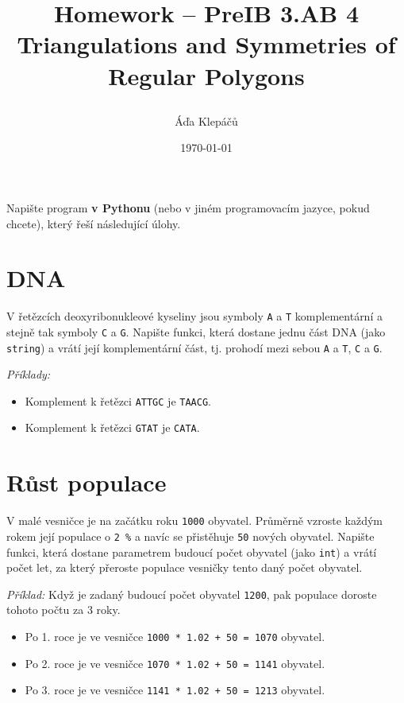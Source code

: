 \documentclass[a4paper,11pt]{article}
\title{\Huge\textsf{Homework -- PreIB 3.AB 4}\\
 \Large\textsf{Triangulations and Symmetries of Regular Polygons}
 \author{Áďa Klepáčů}
 \date{\today}
}
\begin{document}
\thispagestyle{fancy}

Napište program \textbf{v Pythonu} (nebo v jiném programovacím jazyce, pokud
chcete), který řeší následující úlohy.

\section*{DNA}

V řetězcích deoxyribonukleové kyseliny jsou symboly \texttt{A} a \texttt{T}
komplementární a stejně tak symboly \texttt{C} a \texttt{G}. Napište funkci,
která dostane jednu část DNA (jako \texttt{string}) a vrátí její komplementární
část, tj. prohodí mezi sebou \texttt{A} a \texttt{T}, \texttt{C} a \texttt{G}.

\emph{Příklady:}
\begin{itemize}
 \item Komplement k řetězci \texttt{ATTGC} je \texttt{TAACG}.
 \item Komplement k řetězci \texttt{GTAT} je \texttt{CATA}.
\end{itemize}

\section*{Růst populace}

V malé vesničce je na začátku roku \texttt{1000} obyvatel. Průměrně vzroste
každým rokem její populace o \texttt{2 \%} a navíc se přistěhuje \texttt{50}
nových obyvatel. Napište funkci, která dostane parametrem budoucí počet obyvatel
(jako \texttt{int}) a vrátí počet let, za který přeroste populace vesničky tento
daný počet obyvatel.

\emph{Příklad:} Když je zadaný budoucí počet obyvatel \texttt{1200}, pak
populace doroste tohoto počtu za 3 roky.
\begin{itemize}
 \item Po 1. roce je ve vesničce \texttt{1000 * 1.02 + 50 = 1070} obyvatel.
 \item Po 2. roce je ve vesničce \texttt{1070 * 1.02 + 50 = 1141} obyvatel.
 \item Po 3. roce je ve vesničce \texttt{1141 * 1.02 + 50 = 1213} obyvatel.
\end{itemize}
\end{document}
